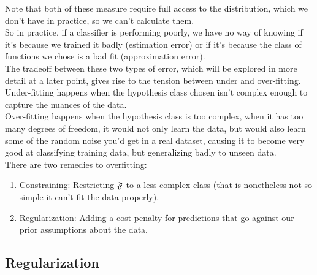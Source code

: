 \documentclass[12pt]{article}
\begin{document}
Note that both of these measure require
full access to the distribution,
which we don't have in practice,
so we can't calculate them. \\
So in practice, if a classifier is performing
poorly, we have no way of knowing 
if it's because we trained it badly
(estimation error)
or if it's because the class of functions 
we chose is a bad fit (approximation error). \\

The tradeoff between these two types of
error, which will be explored in more detail
at a later point,
gives rise to the tension between under and
over-fitting. \\

Under-fitting happens when the hypothesis class
chosen isn't complex enough to capture the
nuances of the data. \\

Over-fitting happens when the hypothesis
class is too complex, when it has too many 
degrees of freedom,
it would not only learn the data,
but would also learn some of the random noise
you'd get in a real dataset,
causing it to become very good at classifying
training data, but generalizing badly to 
unseen data. \\

There are two remedies to overfitting:
\begin{enumerate}
    \item 
    Constraining: Restricting $\mathfrak{F}$
    to a less complex class (that is nonetheless
    not so simple it can't fit the data properly). 
    \item 
    Regularization: Adding a cost penalty
    for predictions that go against our 
    prior assumptions about the data. \\
\end{enumerate}

\newpage

\subsection*{Regularization}



\newpage
\end{document}

